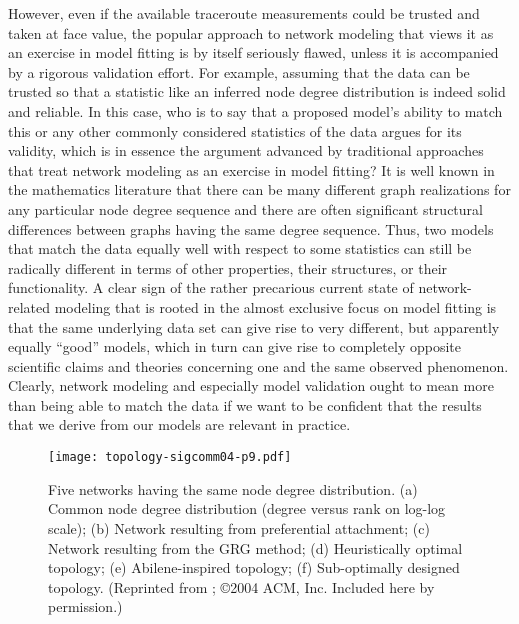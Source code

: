 However, even if the available traceroute measurements could be trusted and taken 
at face value, the popular approach to network modeling that views it as an exercise
in model fitting is by itself seriously flawed, unless it is accompanied by a rigorous
validation effort.  For example, assuming that the data can be trusted so that
a statistic like an inferred node degree distribution is indeed solid and reliable.
In this case, who is to say that a proposed model's ability to match this or any other 
commonly considered statistics of the data argues for its validity, which is in
essence the argument advanced by traditional approaches that treat network modeling
as an exercise in model fitting?  It is well known in the mathematics literature 
that there can be many different graph realizations for any particular node degree sequence
and there are often significant structural differences between graphs having
the same degree sequence. Thus, two models that match the data equally well with 
respect to some statistics can still be radically different in terms of other properties, 
their structures, or their functionality. A clear sign of the rather precarious
current state of network-related modeling that is rooted in the almost exclusive focus
on model fitting is that the same underlying data set can give rise to very
different, but apparently equally ``good'' models, which in turn can give rise to completely 
opposite scientific claims and theories concerning one and the same observed phenomenon.
Clearly, network modeling and especially model validation ought to mean more
than being able to match the data if we want to be confident that the results that we 
derive from our models are relevant in practice.

\begin{figure}[thb] 
  \begin{center}
    
    \texttt{[image: topology-sigcomm04-p9.pdf]}
   
    \caption{
      Five networks having the same node degree distribution. (a) Common node degree
	 distribution (degree versus rank on log-log scale); (b) Network resulting from 
	 preferential attachment; (c) Network resulting from the GRG method; (d) Heuristically 
	 optimal topology; (e) Abilene-inspired topology; (f) Sub-optimally designed topology.
	 (Reprinted from \cite{Li04}; \copyright 2004 ACM, Inc. Included here by permission.)
\label{fig:node_degree}}
  \end{center}
\end{figure}         
 
